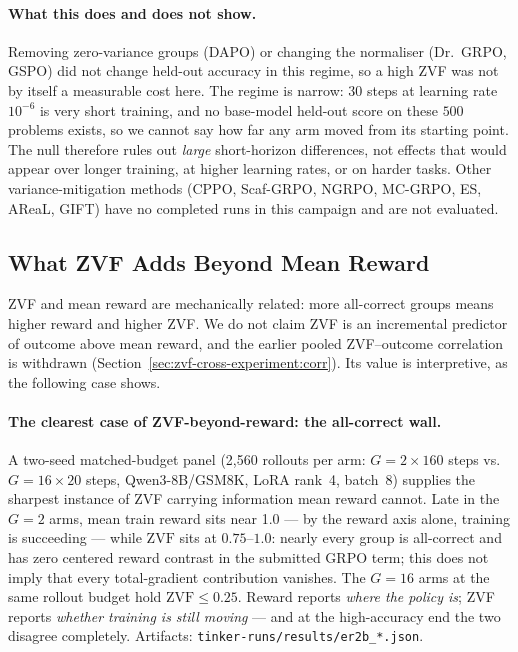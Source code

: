 \paragraph{What this does and does not show.} Removing zero-variance groups (DAPO)
or changing the normaliser (Dr.~GRPO, GSPO) did not change held-out accuracy in
this regime, so a high ZVF was not by itself a measurable cost here. The regime is
narrow: $30$ steps at learning rate $10^{-6}$ is very short training, and no
base-model held-out score on these $500$ problems exists, so we cannot say how far
any arm moved from its starting point. The null therefore rules out
\emph{large} short-horizon differences, not effects that would appear over longer
training, at higher learning rates, or on harder tasks. Other variance-mitigation
methods (CPPO, Scaf-GRPO, NGRPO, MC-GRPO, ES, AReaL, GIFT) have no completed runs
in this campaign and are not evaluated.

\subsection{What ZVF Adds Beyond Mean Reward}
\label{sec:zvf-residualised}
ZVF and mean reward are mechanically related: more all-correct groups means
higher reward and higher ZVF. We do not claim ZVF is an incremental predictor of
outcome above mean reward, and the earlier pooled ZVF--outcome correlation is
withdrawn (Section~\ref{sec:zvf-cross-experiment:corr}). Its value is
interpretive, as the following case shows.

\paragraph{The clearest case of ZVF-beyond-reward: the all-correct wall.}
A two-seed matched-budget panel (2{,}560 rollouts per arm:
$G{=}2\times160$ steps vs.\ $G{=}16\times20$ steps, Qwen3-8B/GSM8K,
LoRA rank~4, batch~8) supplies the sharpest instance of ZVF carrying
information mean reward cannot. Late in the $G{=}2$ arms, mean train
reward sits near 1.0 --- by the reward axis alone, training is
succeeding --- while $\mathrm{ZVF}$ sits at $0.75$--$1.0$: nearly every
group is all-correct and has zero centered reward contrast in the submitted
GRPO term; this does not imply that every total-gradient contribution vanishes.
The $G{=}16$ arms at
the same rollout budget hold $\mathrm{ZVF}\le0.25$. Reward reports
\emph{where the policy is}; ZVF reports \emph{whether training is still
moving} --- and at the high-accuracy end the two disagree completely.
Artifacts: \texttt{tinker-runs/results/er2b\_*.json}.


